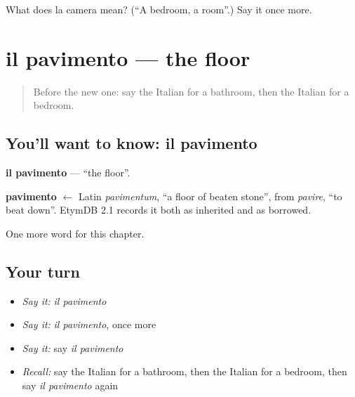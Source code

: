 \begin{tcolorbox}[breakable,colback=teal!4,colframe=teal!35!black,title={Before you move on}]
What does la camera mean? (\textquotedblleft{}A bedroom, a room\textquotedblright{}.) Say it once more.
\end{tcolorbox}
\section[il pavimento]{il pavimento — the floor}

\label{lesson:IT-C58-pavimento}



\begin{quote}
Before the new one: say the Italian for a bathroom, then the Italian for a bedroom.
\end{quote}

\subsection*{You'll want to know: il pavimento}
\textbf{il pavimento} — \textquotedblleft{}the floor\textquotedblright{}.

\begin{cousinweb}
\textbf{pavimento} $\leftarrow$ Latin \emph{pavimentum}, \textquotedblleft{}a floor of beaten stone\textquotedblright{}, from \emph{pavire}, \textquotedblleft{}to beat down\textquotedblright{}. EtymDB 2.1 records it both as inherited and as borrowed.
\end{cousinweb}

\begin{grammarlens}[title={What you've built}]
One more word for this chapter.
\end{grammarlens}

\subsection*{Your turn}
\begin{itemize}
\raggedright
  \item \emph{Say it:} \emph{il pavimento}
  \item \emph{Say it:} \emph{il pavimento}, once more
  \item \emph{Say it:} say \emph{il pavimento}
  \item \emph{Recall:} say the Italian for a bathroom, then the Italian for a bedroom, then say \emph{il pavimento} again
\end{itemize}

